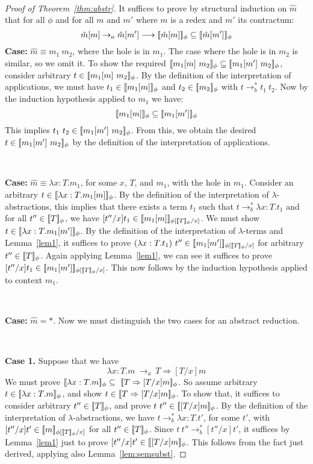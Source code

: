 \documentclass{LMCS}
\newcommand{\To}[0]{\Rightarrow}
\newcommand{\interp}[1]{[\negthinspace[#1]\negthinspace]}
\begin{document}
\

\begin{proof}[Proof of Theorem~\ref{thm:abstr}]
It suffices to prove by structural induction on $\hat{m}$ that for all
$\phi$ and for all $m$ and $m'$ where $m$ is a redex and $m'$ its
contractum:
\[
\hat{m}[m] \to_a \hat{m}[m']\longrightarrow \interp{\hat{m}[m]}_\phi\subseteq\interp{\hat{m}[m']}_\phi
\]
\noindent \textbf{Case:} $\hat{m}\equiv m_1\ m_2$, where the hole is
in $m_1$.  The case where the hole is in $m_2$ is similar, so we omit
it.  To show the required
$\interp{m_1[m]\ m_2}_\phi\subseteq\interp{m_1[m']\ m_2}_\phi$,
consider arbitrary $t\in\interp{m_1[m]\ m_2}_\phi$.  By the definition
of the interpretation of applications, we must have
$t_1\in\interp{m_1[m]}_\phi$ and $t_2\in\interp{m_2}_\phi$ with
$t\to_b^* t_1\ t_2$.  Now by the induction hypothesis applied to
$m_1$ we have:
\[
\interp{m_1[m]}_\phi\subseteq\interp{m_1[m']}_\phi
\]
\noindent This implies $t_1\ t_2\in\interp{m_1[m']\ m_2}_\phi$.  From
this, we obtain the desired $t\in\interp{m_1[m']\ m_2}_\phi$ by the
definition of the interpretation of applications.

\

\noindent \textbf{Case:} $\hat{m}\equiv \lambda x:T.m_1$, for some
$x$, $T$, and $m_1$, with the hole in $m_1$.  Consider an arbitrary
$t\in\interp{\lambda x:T.m_1[m]}_\phi$.  By the definition of the
interpretation of $\lambda$-abstractions, this implies that there
exists a term $t_1$ such that $t\to_b^*\lambda x:T.t_1$ and for all
$t''\in\interp{T}_\phi$, we have
$[t''/x]t_1\in\interp{m_1[m]}_{\phi[\interp{T}_\phi/x]}$.  We must
show $t\in\interp{\lambda x:T.m_1[m']}_\phi$.  By the definition of
the interpretation of $\lambda$-terms and Lemma~\ref{lem1}, it suffices to
prove $(\lambda
x:T.t_1)\ t''\in\interp{m_1[m']}_{\phi[\interp{T}_\phi/x]}$ for
arbitrary $t''\in\interp{T}_\phi$.  Again applying Lemma~\ref{lem1},
we can see it suffices to prove
$[t''/x]t_1\in\interp{m_1[m']}_{\phi[\interp{T}_\phi/x]}$.  This now
follows by the induction hypothesis applied to context $m_1$.

\

\noindent \textbf{Case:} $\hat{m}=*$.  Now we must distinguish the
two cases for an abstract reduction.

\

\noindent \textbf{Case 1.} Suppose that we have
\[
\lambda x:T.m\ \to_a\ T\To[T/x]m
\]
\noindent We must prove $\interp{\lambda
  x:T.m}_\phi\subseteq\ \interp{T\To[T/x]m}_\phi$.  So assume
arbitrary $t\in\interp{\lambda x:T.m}_\phi$, and show
$t\in\interp{T\To[T/x]m}_\phi$.  To show that, it suffices to consider
arbitrary $t''\in\interp{T}_\phi$, and prove
$t\ t''\in\interp{[T/x]m}_\phi$.  By the definition of the
interpretation of $\lambda$-abstractions, we have $t\to_b^*\lambda
x:T.t'$, for some $t'$, with
$[t''/x]t'\in\interp{m}_{\phi[\interp{T}_\phi/x]}$ for all
$t''\in\interp{T}_\phi$.  Since $t\ t''\to_b^*[t''/x]t'$, it suffices
by Lemma~\ref{lem1} just to prove $[t''/x]t'\in\interp{[T/x]m}_\phi$.
This follows from the fact just derived, applying also Lemma~\ref{lem:semsubst}.



\end{proof}
\end{document}
